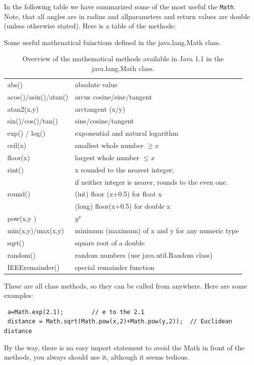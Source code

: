 In the following table we have summarized some of the most useful the 
\verb|Math|. Note, that all angles are in radins and allparameters and
return values are double (unless otherwise stated). 
Here is a table of the methods:
\begin{table}[htbp]
\caption{Some useful mathenatical fuinctions defined in the
  java.lang.Math class.}
  \begin{center}
    \leavevmode
    \begin{tabular}{ll}
      abs() & absolute value \\
      acos()/asin()/atan() & arcus cosine/sine/tangent \\
      atan2(x,y) & arctangent (x/y)  \\
      sin()/cos()/tan() & sine/cosine/tangent\\
      exp() / log() & exponential and natural logarithm \\
      ceil(x) & smallest whole number $\ge x$ \\
      floor(x) & largest whole number $\le x$ \\
      rint() & x rounded to the nearest integer; \\
             &  if neither integer is
                        nearer, rounds to the even one. \\
      round() & (int) floor (x+0.5) for float x \\
       ~       & (long) floor(x+0.5) for double x \\
      pow(x,y ) & $y^x$\\
      min(x,y)/max(x,y)  & minimum (maximum)  of x and y for any numeric type  \\
      sqrt() & square root of a double \\
      random() & random numbers (use java.util.Random class)\\
      IEEEremainder() & special remainder function \\
    \end{tabular}
    \caption{Overview of the mathematical methods available in Java 1.1 in the java.lang.Math class.}
    \label{tab:math_table}
  \end{center}
\end{table}

These are all class methods, so they can be called from anywhere.
Here are some examples:
\begin{verbatim}
 a=Math.exp(2.1);        // e to the 2.1
 distance = Math.sqrt(Math.pow(x,2)+Math.pow(y,2));  // Euclidean distance
\end{verbatim} 
By the way, there is no easy import statement to avoid the Math in front
of the methods, you always should use it, although it seems 
tedious.

